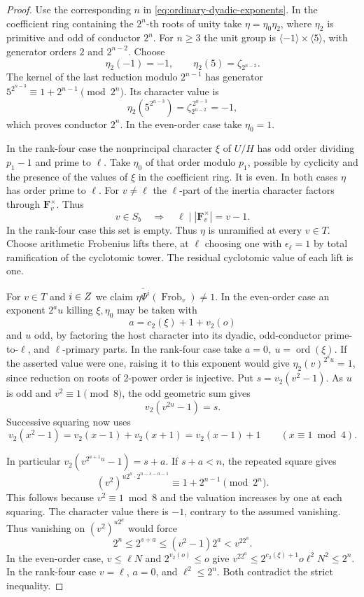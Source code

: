 \begin{proof}
Use the corresponding \(n\) in \eqref{eq:ordinary-dyadic-exponents}.
In the coefficient ring containing the \(2^n\)-th roots of unity take
\(\eta=\eta_0\eta_2\), where \(\eta_2\) is primitive and odd of conductor
\(2^n\). For \(n\ge3\) the unit group is
\(\langle-1\rangle\times\langle5\rangle\), with generator orders
\(2\) and \(2^{n-2}\). Choose
\[
                \eta_2(-1)=-1,\qquad
                \eta_2(5)=\zeta_{2^{n-2}} .
\]
The kernel of the last reduction modulo \(2^{n-1}\)
has generator \(5^{2^{n-3}}\equiv1+2^{n-1}\pmod{2^n}\).
Its character value is
\[
       \eta_2(5^{2^{n-3}})=\zeta_{2^{n-2}}^{\,2^{n-3}}=-1,
\]
which proves conductor \(2^n\).
In the even-order case take \(\eta_0=1\).

In the rank-four case the nonprincipal character \(\xi\) of \(U/H\) has odd order dividing \(p_1-1\) and prime to \(\ell\).
Take \(\eta_0\) of that order modulo \(p_1\), possible by cyclicity
and the presence of the values of \(\xi\) in the coefficient ring. It is even.
In both cases \(\eta\) has order prime to \(\ell\).
For \(v\ne\ell\) the \(\ell\)-part of the inertia character factors through \(\mathbf F_v^\times\). Thus
\[
 v\in S_b\quad\Longrightarrow\quad \ell\mid |\mathbf F_v^\times|=v-1 .
\] In the rank-four case this set is empty.
Thus \(\eta\) is unramified at every \(v\in T\). Choose arithmetic
Frobenius lifts there, at \(\ell\) choosing one with \(\epsilon_\ell=1\)
by total ramification of the cyclotomic tower. The residual cyclotomic
value of each lift is one.

For \(v\in T\) and \(i\in Z\) we claim
\(\overline{\eta\Psi^i}(\operatorname{Frob}_v)\ne1\).
In the even-order case an exponent \(2^a u\) killing \(\xi,\eta_0\) may be taken
with
\[
 a=c_2(\xi)+1+v_2(o)
\]
and \(u\) odd, by factoring the host
character into its dyadic, odd-conductor prime-to-\(\ell\), and
\(\ell\)-primary parts. In the rank-four case take \(a=0,\ u=\operatorname{ord}(\xi)\).
If the asserted value were one, raising it to this exponent would give
\(\eta_2(v)^{2^a u}=1\), since reduction on roots of 2-power order is
injective. Put \(s=v_2(v^2-1)\). As \(u\) is odd and \(v^2\equiv1\pmod8\), the odd geometric sum gives
\[
 v_2(v^{2u}-1)=s.
\]
Successive squaring now uses
\[
 v_2(x^2-1)=v_2(x-1)+v_2(x+1)=v_2(x-1)+1
 \qquad(x\equiv1\bmod 4).
\]

In particular \(v_2(v^{2^{a+1}u}-1)=s+a\). If \(s+a<n\), the repeated square gives
\[
    (v^2)^{u2^a\cdot2^{n-s-a-1}}\equiv1+2^{n-1}\pmod{2^n}.
\]
This follows because \(v^2\equiv1\bmod8\) and the valuation
increases by one at each squaring. The character value there
is \(-1\), contrary to the assumed vanishing. Thus vanishing on \((v^2)^{u2^a}\) would force
\[
         2^n\le2^{s+a}\le(v^2-1)2^a<v^22^a .
\]
In the even-order case, \(v\le\ell N\) and \(2^{v_2(o)}\le o\)
give \(v^22^a\le 2^{c_2(\xi)+1}o\ell^2N^2\le 2^n\).
In the rank-four case \(v=\ell\), \(a=0\), and
\(\ell^2\le2^n\). Both contradict the strict inequality.


\end{proof}
